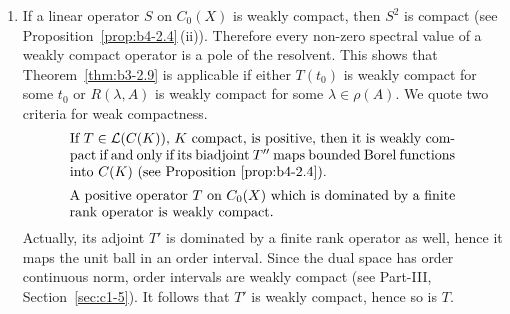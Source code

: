 \begin{remarks}
\begin{enumerate}[\upshape (i), wide, labelindent=.25em]
	We sketch the proof of the equivalence of (a) and (b)
    assuming that $s(A) = 0$.
	If\/ $0$ is a first order pole, then the residue $P$ is a positive projection satisfying $PE = \Kern{A}$, $P'E' = \Kern{A'}$ (see Part-I, Example~\ref{ex:a3-3.6}).
	Thus given $0 < f \in \Kern{A}$ and any $0 \leq \psi \in E'$ such that $\langle f,\psi \rangle > 0$, we have for $\phi \coloneq P'\psi \in \Kern{A'}$, and
    \[
    \langle f,\phi \rangle = \langle f, P'\psi \rangle = \langle Pf,\psi \rangle = \langle f,\psi \rangle > 0 .
    \]
	To prove the reverse direction, we first observe that the highest coefficient $Q_{k}$ of the Laurent expansion is a positive operator.
	Thus if\/ $0$ is a pole of order $k \geq 2$, we choose $0 < h \in E$ such that $f \coloneq Q_{k}h > 0$.
	Then $Af = AQ_{k}h = 0$ and for every $\phi \in \Kern{A'}$ we have 
    \[
    \langle f,\phi \rangle = \langle Q_{k}h,\phi \rangle = \langle h,Q_{k}'\phi \rangle = \langle h,Q_{k-1}'A'\phi \rangle = 0 .
    \]
	\item 
	If a linear operator $S$ on $C_{0}(X)$ is weakly compact, then $S^{2}$ is compact (see Proposition~\ref{prop:b4-2.4}\,(ii)).
	Therefore every non-zero spectral value of a weakly compact operator is a pole of the resolvent.
	This shows that Theorem~\ref{thm:b3-2.9} is applicable if either $T(t_{0})$ is weakly compact for some $t_{0}$ or $R(\lambda,A)$ is weakly compact for some $\lambda \in \rho(A)$.
	We quote two criteria for weak compactness.
    \begin{equation}\label{eq:b3-2.31}
		\begin{minipage}{.8\textwidth}
    	If   $T \in \L{C(K)}$, $K$ compact, is positive, then it is weakly compact  	if and only if its biadjoint 	$T''$ maps bounded Borel functions into $C(K)$ (see Proposition~\ref{prop:b4-2.4}).
    	\end{minipage}
	\end{equation}
	\begin{equation}\label{eq:b3-2.32}
        \begin{minipage}{.8\textwidth}
    		A positive operator   $T$ on $C_{0}(X)$ which is dominated by a finite rank 
    		operator is weakly compact. 
    	\end{minipage}
    \end{equation}
    Actually, its adjoint  $T'$ is dominated by a finite rank operator as well, hence it maps the unit ball in an order interval. Since the dual space has order continuous norm, order intervals are weakly compact (see Part-III, Section~\ref{sec:c1-5}). 
	It follows that $ T' $  is weakly compact, hence so is $T$.		
		

\end{enumerate}
\end{remarks}
